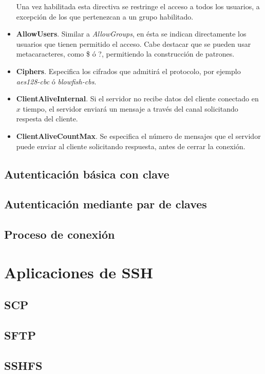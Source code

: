 \documentclass[a4paper, 11pt, titlepage]{article}
\begin{document}
\begin{itemize}
            Una vez habilitada esta directiva se restringe el acceso a todos los usuarios, a excepción de los que
            pertenezcan a un grupo habilitado.
            \item \textbf{AllowUsers}. Similar a \textit{AllowGroups}, en ésta se indican directamente los usuarios 
            que tienen permitido el acceso. Cabe destacar que se pueden usar metacaracteres, como \$ ó ?, permitiendo 
            la construcción de patrones.
            \item \textbf{Ciphers}. Especifica los cifrados que admitirá el protocolo, por ejemplo 
            \textit{aes128-cbc} ó \textit{blowfish-cbs}.
            \item \textbf{ClientAliveInternal}. Si el servidor no recibe datos del cliente conectado en $x$ tiempo, el 
            servidor enviará un mensaje a través del canal solicitando respesta del cliente.
            \item \textbf{ClientAliveCountMax}. Se especifica el número de mensajes que el servidor puede enviar al cliente 
            solicitando respuesta, antes de cerrar la conexión. 
        \end{itemize}

    \subsection{Autenticación básica con clave}
    \subsection{Autenticación mediante par de claves}
    \subsection{Proceso de conexión}
\section{Aplicaciones de SSH}
    \subsection{SCP}
    \subsection{SFTP}
    \subsection{SSHFS}
\end{document}
